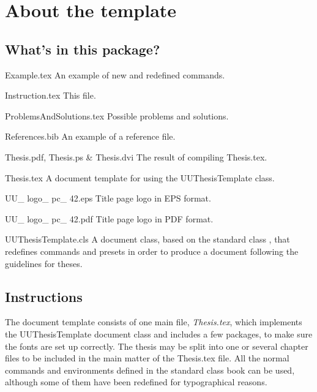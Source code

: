 \chapter{About the template}
\section{What's in this package?}

\begin{definitionlist}
    \item{Example.tex} An example of new and redefined commands.
    \item{Instruction.tex} This file.
    \item{ProblemsAndSolutions.tex} Possible problems and solutions.
    \item{References.bib} An example of a reference file. 
    \item{Thesis.pdf, Thesis.ps \& Thesis.dvi} The result of compiling Thesis.tex.
    \item{Thesis.tex} A document template for using the UUThesisTemplate class.
    \item{UU\_ logo\_ pc\_ 42.eps} Title page logo in EPS format.
    \item{UU\_ logo\_ pc\_ 42.pdf} Title page logo in PDF format.
    \item{UUThesisTemplate.cls} A document class, based on the standard class , that redefines commands and presets in order to produce a document following the guidelines for theses.   
\end{definitionlist}

\section{Instructions}
The document template consists of one main file, \emph{Thesis.tex}, which implements the UUThesisTemplate document class and includes a few packages, to make sure the fonts are set up correctly. The thesis may be split into one or several chapter files to be included in the main matter of the Thesis.tex file. All the normal commands and environments defined in the standard class book can be used, although some of them have been redefined for typographical reasons. 


